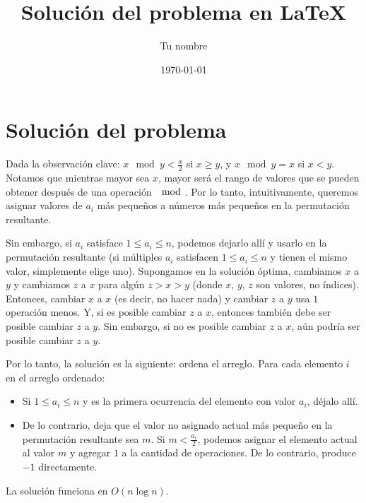 \documentclass{article}
\begin{document}
\title{Solución del problema en LaTeX}
\author{Tu nombre}
\date{\today}

\maketitle

\section{Solución del problema}

Dada la observación clave: $x \mod y < \frac{x}{2}$ si $x \geq y$, y $x \mod y = x$ si $x < y$. Notamos que mientras mayor sea $x$, mayor será el rango de valores que se pueden obtener después de una operación $\mod$. Por lo tanto, intuitivamente, queremos asignar valores de $a_i$ más pequeños a números más pequeños en la permutación resultante.

Sin embargo, si $a_i$ satisface $1 \leq a_i \leq n$, podemos dejarlo allí y usarlo en la permutación resultante (si múltiples $a_i$ satisfacen $1 \leq a_i \leq n$ y tienen el mismo valor, simplemente elige uno). Supongamos en la solución óptima, cambiamos $x$ a $y$ y cambiamos $z$ a $x$ para algún $z > x > y$ (donde $x$, $y$, $z$ son valores, no índices). Entonces, cambiar $x$ a $x$ (es decir, no hacer nada) y cambiar $z$ a $y$ usa $1$ operación menos. Y, si es posible cambiar $z$ a $x$, entonces también debe ser posible cambiar $z$ a $y$. Sin embargo, si no es posible cambiar $z$ a $x$, aún podría ser posible cambiar $z$ a $y$.

Por lo tanto, la solución es la siguiente: ordena el arreglo. Para cada elemento $i$ en el arreglo ordenado:

\begin{itemize}
    \item Si $1 \leq a_i \leq n$ y es la primera ocurrencia del elemento con valor $a_i$, déjalo allí.
    \item De lo contrario, deja que el valor no asignado actual más pequeño en la permutación resultante sea $m$. Si $m < \frac{a_i}{2}$, podemos asignar el elemento actual al valor $m$ y agregar $1$ a la cantidad de operaciones. De lo contrario, produce $-1$ directamente.
\end{itemize}

La solución funciona en $O(n \log n)$.
\end{document}
